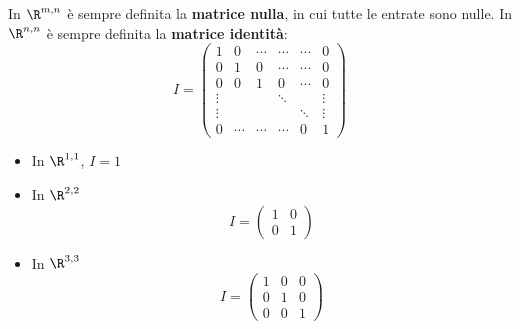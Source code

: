 
In  $\R^{m,n}$ è sempre definita la \textbf{matrice nulla}, in cui tutte le entrate sono nulle. In $\R^{n,n}$ è sempre definita la \textbf{matrice identità}:
\[
I=\begin{pmatrix}
1 & 0 & \cdots & \cdots & \cdots & 0 \\
0 & 1 & 0 & \cdots & \cdots & 0 \\
0 & 0 & 1 & 0 &\cdots & 0 \\
\vdots & & & \ddots & & \vdots \\
\vdots & & & & \ddots & \vdots \\
0 & \cdots & \cdots & \cdots & 0 & 1
\end{pmatrix}
\]
\begin{itemize}
\item In $\R^{1,1}$, $I=1$
\item In $\R^{2,2}$
\[
I=\begin{pmatrix}
1 & 0 \\
0 & 1
\end{pmatrix}
\]
\item In $\R^{3,3}$
\[
I=\begin{pmatrix}
1 & 0 & 0 \\
0 & 1 & 0 \\
0 & 0 & 1
\end{pmatrix}
\]
\end{itemize}

